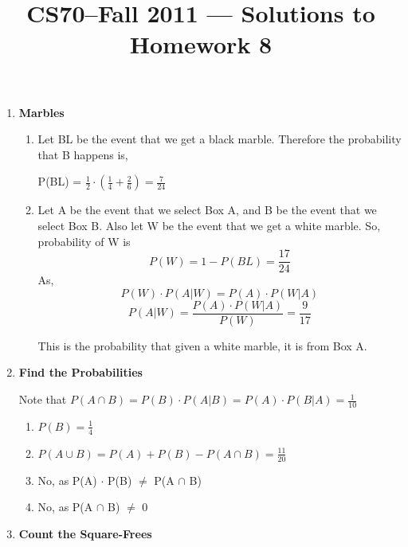 \documentclass[11pt]{article}
\title{CS70--Fall 2011 --- Solutions to Homework 8}
\date{}
\begin{document}
	\maketitle

	\begin{enumerate}
		
		\item \textbf{Marbles}
			
			\begin{enumerate}
				\item Let BL be the event that we get a black marble. Therefore the probability that B happens is, \\	
				\begin{center}
P(BL) = $\frac{1}{2} \cdot ( \frac{1}{4} + \frac{2}{6} ) = \frac{7}{24}$
				\end{center}	 
				
				\item Let A be the event that we select Box A, and B be the event that we select Box B. Also let W be the event that we get a white marble. So, probability of W is 
				$$P(W) = 1 - P(BL) = \frac{17}{24}$$
				As, 
				$$P(W) \cdot P(A | W) = P(A) \cdot P(W | A)$$
				$$P(A | W) = \frac{P(A) \cdot P(W | A)}{ P(W) } = \frac{9}{17}$$
				
				This is the probability that given a white marble, it is from Box A. 
			\end{enumerate}
			
		\item \textbf{Find the Probabilities}
			
			Note that $P(A \cap B) = P(B) \cdot P(A | B) = P(A) \cdot P(B | A) = \frac{1}{10}$
			
			\begin{enumerate}
				\item $P(B) = \frac{1}{4}$
				\item $P(A \cup B) = P(A) + P(B) - P(A \cap B) = \frac{11}{20}$
				\item No, as P(A) $\cdot$ P(B) $\neq$ P(A $\cap$ B)
				\item No, as P(A $\cap$ B) $\neq$ 0
			\end{enumerate}
			
		\item \textbf{Count the Square-Frees}
		

\end{enumerate}
\end{document}
